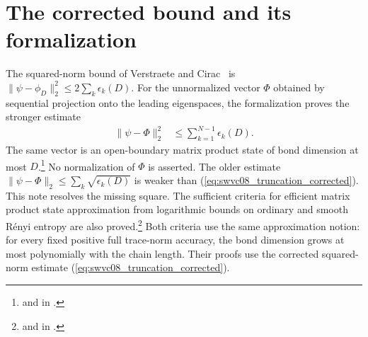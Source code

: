 \documentclass{article}
\begin{document}
\newpage
\section{The corrected bound and its formalization}

The squared-norm bound of Verstraete and Cirac~\cite[Lemma~1]{VerstraeteCirac2006Faithfully} is
$\|\psi-\phi_D\|_2^2\le2\sum_k\epsilon_k(D)$.
For the unnormalized vector $\Phi$ obtained by sequential projection onto
the leading eigenspaces, the formalization proves the stronger estimate
\begin{align}
    \|\psi-\Phi\|_2^2 & \le\sum_{k=1}^{N-1}\epsilon_k(D).
    \label{eq:swvc08_truncation_corrected}
\end{align}
The same vector is an open-boundary matrix product state of bond dimension
at most $D$.\footnote{
    and 
    in .}
No normalization of $\Phi$ is asserted. The older estimate
$\|\psi-\Phi\|_2\le\sum_k\sqrt{\epsilon_k(D)}$ is weaker than
(\ref{eq:swvc08_truncation_corrected}).
This note resolves the missing square. The sufficient criteria for efficient
matrix product state approximation from logarithmic bounds on ordinary and
smooth R\'enyi entropy are also proved.\footnote{
    and 
    in .}
Both criteria use the same approximation notion: for every fixed positive
full trace-norm accuracy, the bond dimension grows at most polynomially with
the chain length. Their proofs use the corrected squared-norm estimate
(\ref{eq:swvc08_truncation_corrected}).



\end{document}
